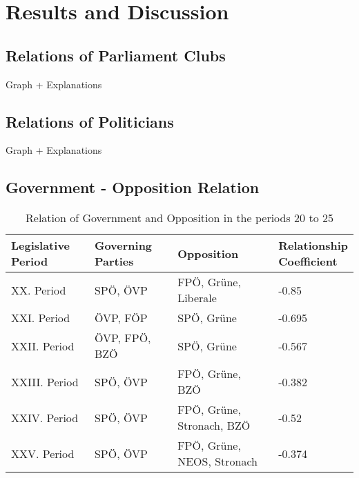 \chapter{Results and Discussion}
\label{chap:evaluation}

\section{Relations of Parliament Clubs}
\label{sec:relations_clubs}
Graph + Explanations

\section{Relations of Politicians}
Graph + Explanations

\section{Government - Opposition Relation}
\label{sec:gov_opp_relation}

\begin{table}[h]

\bgroup
\def\arraystretch{1.2}
\begin{tabular}{| l | l | p{4cm} | l |}
\hline
  Legislative Period & Governing Parties & Opposition & \linebreakcell{Relationship\\Coefficient}  \\
\hline
\hline
  XX. Period & SPÖ, ÖVP & FPÖ, Grüne, Liberale & -0.85 \\
\hline
  XXI. Period & ÖVP, FÖP & SPÖ, Grüne & -0.695 \\
\hline
  XXII. Period & ÖVP, FPÖ, BZÖ & SPÖ, Grüne & -0.567 \\
\hline
  XXIII. Period & SPÖ, ÖVP & FPÖ, Grüne, BZÖ & -0.382 \\
\hline
  XXIV. Period & SPÖ, ÖVP & FPÖ, Grüne, Stronach, BZÖ & -0.52 \\
\hline
  XXV. Period & SPÖ, ÖVP & FPÖ, Grüne, NEOS, Stronach & -0.374 \\
\hline

\end{tabular}
\egroup
\caption{Relation of Government and Opposition in the periods 20 to 25}
\label{table:gov_opp_relation}
\end{table}